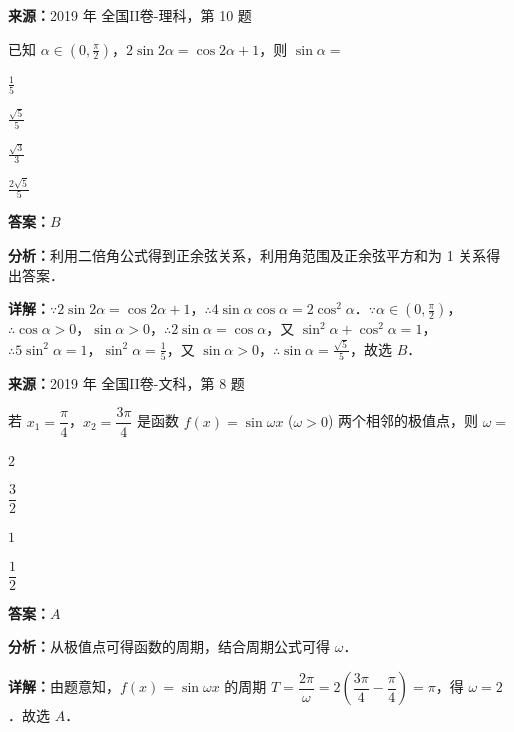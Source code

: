 \begin{question}[points=5]
\textbf{来源：}2019 年 全国II卷-理科，第 10 题\par
已知 $\alpha\in(0,\frac{\pi}{2})$，$2\sin 2\alpha=\cos 2\alpha+1$，则 $\sin\alpha=$
\begin{choices}
  \item $\frac{1}{5}$
  \item $\frac{\sqrt{5}}{5}$
  \item $\frac{\sqrt{3}}{3}$
  \item $\frac{2\sqrt{5}}{5}$
\end{choices}
\begin{solution}
\textbf{答案：}$B$

\textbf{分析：}利用二倍角公式得到正余弦关系，利用角范围及正余弦平方和为 1 关系得出答案．

\textbf{详解：}$\because 2\sin 2\alpha=\cos 2\alpha+1$，$\therefore 4\sin\alpha\cos\alpha=2\cos^2\alpha$．$\because \alpha\in(0,\frac{\pi}{2})$，$\therefore \cos\alpha>0$，$\sin\alpha>0$，$\therefore 2\sin\alpha=\cos\alpha$，又 $\sin^2\alpha+\cos^2\alpha=1$，$\therefore 5\sin^2\alpha=1$，$\sin^2\alpha=\frac{1}{5}$，又 $\sin\alpha>0$，$\therefore \sin\alpha=\frac{\sqrt{5}}{5}$，故选 $B$．
\end{solution}
\end{question}

\begin{question}[points=5]
\textbf{来源：}2019 年 全国II卷-文科，第 8 题\par
若 $x_1=\dfrac{\pi}{4}$，$x_2=\dfrac{3\pi}{4}$ 是函数 $f(x)=\sin\omega x$ ($\omega>0$) 两个相邻的极值点，则 $\omega=$
\begin{choices}
  \item $2$
  \item $\dfrac{3}{2}$
  \item $1$
  \item $\dfrac{1}{2}$
\end{choices}
\begin{solution}
\textbf{答案：}$A$

\textbf{分析：}从极值点可得函数的周期，结合周期公式可得 $\omega$．

\textbf{详解：}由题意知，$f(x)=\sin\omega x$ 的周期 $T=\dfrac{2\pi}{\omega}=2\left(\dfrac{3\pi}{4}-\dfrac{\pi}{4}\right)=\pi$，得 $\omega=2$．故选 $A$．
\end{solution}
\end{question}

